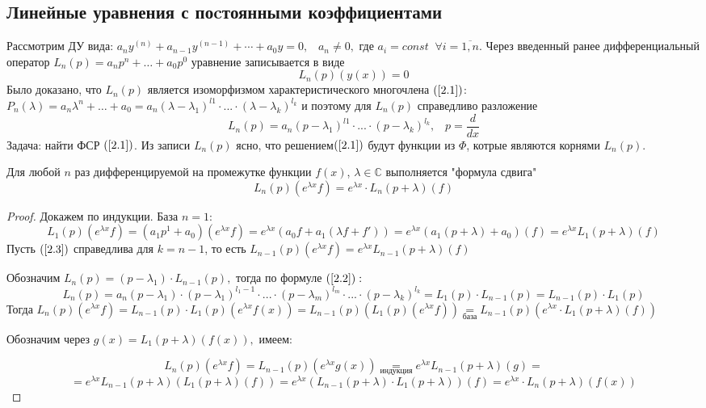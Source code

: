 \subsection{Линейные уравнения с поcтоянными коэффициентами}
Рассмотрим ДУ вида: $a_n y^{(n)}+a_{n-1}y^{(n-1)} + \cdots +a_0y=0, \;\;\;a_n \neq 0, $ где $a_i=const\;\;\forall i=\overline{1, n}.$ Через введенный ранее дифференциальный оператор $L_n(p)=a_np^n+ \dots + a_0 p^0$ уравнение записывается в виде \begin{equation}\tag{2.1}
\label{2.1}
    L_n(p)(y(x))=0
\end{equation}
Было доказано, что $L_n(p)$ является изоморфизмом характеристического многочлена $(\ref{2.1})$: $P_n(\lambda)=a_n\lambda^n+\dots+a_0=a_n(\lambda-\lambda_1)^{l1}\cdot ... \cdot (\lambda-\lambda_{k})^{l_k}$ и поэтому для $L_n(p)$ справедливо разложение \begin{equation}
    \tag{2.2}
    \label{2.2}
    L_n(p)=a_n(p-\lambda_1)^{l1}\cdot ... \cdot (p-\lambda_{k})^{l_k}, \;\;\;p=\frac{d}{dx}
\end{equation}
Задача: найти ФСР $(\ref{2.1})$. Из записи $L_n(p)$ ясно, что решением$ (\ref{2.1})$ будут функции из $\varPhi$, котрые являются корнями $L_n(p)$.
\begin{lemma}
Для любой $n$ раз дифференцируемой на промежутке функции $f(x)$, $\lambda\in\mathds{C}$ выполняется "формула сдвига" \begin{equation}
    \tag{2.3}
    \label{2.3}
    L_n(p)(e^{\lambda x}f)=e^{\lambda x}\cdot L_n(p+\lambda)(f)
\end{equation}  
\end{lemma}
\begin{proof}
Докажем по индукции. База $n=1$: $$L_1(p)(e^{\lambda x}f)=(a_1p^1+a_0)(e^{\lambda x}f)=e^{\lambda x}(a_0f+a_1(\lambda f+ f'))=e^{\lambda x}(a_1(p+\lambda)+a_0)(f)=e^{\lambda x}L_1(p+\lambda)(f)$$
Пусть $(\ref{2.3})$ справедлива для $k=n-1$, то есть $L_{n-1}(p)(e^{\lambda x} f)=e^{\lambda x} L_{n-1}(p+\lambda)(f)$\par
Обозначим $L_n(p)=(p-\lambda_1)\cdot L_{n-1}(p),$ тогда по формуле $(\ref{2.2}):$
$$L_n(p)=a_n(p-\lambda_1)\cdot (p-\lambda_1)^{l_1-1}\cdot ...\cdot (p-\lambda_m)^{l_m} \cdot ... \cdot (p-\lambda_k)^{l_k}=L_1(p)\cdot L_{n-1}(p)=L_{n-1}(p)\cdot L_1(p)$$
Тогда $L_n(p)(e^{\lambda x }f) = L_{n-1}(p) \cdot L_1(p)(e^{\lambda x}f(x))=L_{n-1}(p)(L_1(p)(e^{\lambda x}f))\underset{\text{база}}{=} L_{n-1}(p)(e^{\lambda x}\cdot L_1(p+\lambda) (f))$\par
Обозначим через $g(x)=L_1(p+\lambda)(f(x)),$ имеем:

$$L_n(p)(e^{\lambda x}f) = L_{n-1}(p)(e^{\lambda x}g(x))\underset{\text{индукция}}{=}e^{\lambda x}L_{n-1}(p+\lambda)(g) = $$ $$ = e^{\lambda x}L_{n-1}(p+\lambda)(L_1(p+\lambda)(f))=e^{\lambda x}(L_{n-1}(p+\lambda)\cdot L_{1}(p+\lambda))(f)=e^{\lambda x}\cdot L_n(p+\lambda)(f(x))$$

\end{proof}
